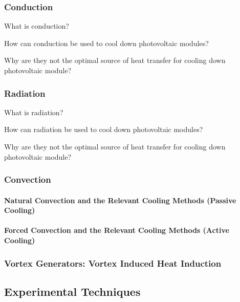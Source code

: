 \subsubsection{Conduction} %
\noindent What is conduction?\par
\noindent How can conduction be used to cool down photovoltaic modules?\par
\noindent Why are they not the optimal source of heat transfer for cooling down photovoltaic module?\par

\subsubsection{Radiation} %
\noindent What is radiation?\par
\noindent How can radiation be used to cool down photovoltaic modules?\par
\noindent Why are they not the optimal source of heat transfer for cooling down photovoltaic module?\par

\subsubsection{Convection} %
\paragraph{Natural Convection and the Relevant Cooling Methods (Passive Cooling)} %
\paragraph{Forced Convection and the Relevant Cooling Methods (Active Cooling)} %
\subsubsection{Vortex Generators: Vortex Induced Heat Induction} %

\pagebreak
\subsection{Experimental Techniques}
